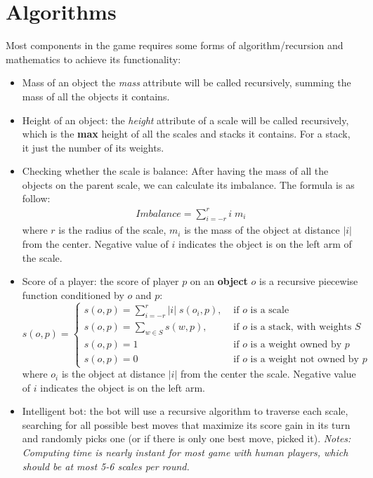\documentclass[12pt]{article}
\begin{document}
\section{Algorithms}
Most components in the game requires some forms of algorithm/recursion and
mathematics to achieve its functionality:
\begin{itemize}
  \item Mass of an object the \textit{mass} attribute will be called recursively,
    summing the mass of all the objects it contains.
  \item Height of an object: the \textit{height} attribute of a scale will be
    called recursively, which is the \textbf{max} height of all the scales and
    stacks it contains. For a stack, it just the number of its weights.
  \item Checking whether the scale is balance: After having the mass of all the
    objects on the parent scale, we can calculate its imbalance. The formula is
    as follow:
    \begin{align*}
      Imbalance = \sum_{i=-r}^{r}i\;m_i
    \end{align*}
    where $r$ is the radius of the scale, $m_i$ is the mass of the object at
    distance $|i|$ from the center. Negative value of $i$ indicates the object
    is on the left arm of the scale.
  \item Score of a player: the score of player $p$ on an \textbf{object} $o$
    is a recursive piecewise function conditioned by $o$ and $p$:
    \begin{equation*}
      s(o,p) = \begin{cases}
        s(o, p) = \sum_{i=-r}^{r} |i|\;s(o_i, p) , &\text{ if $o$ is a scale}\\
        s(o, p) = \sum_{w\in S} s(w, p) , &\text{ if $o$ is a stack, with
        weights $S$}\\
        s(o, p) = 1 &\text{ if $o$ is a weight owned by $p$}\\
        s(o, p) = 0 &\text{ if $o$ is a weight not owned by $p$}
      \end{cases}
    \end{equation*}
    where $o_i$ is the object at distance $|i|$ from the center the scale.
    Negative value of $i$ indicates the object is on the left arm.
  \item Intelligent bot: the bot will use a recursive algorithm to traverse each
    scale, searching for all possible best moves that maximize its score gain in
    its turn and randomly picks one (or if there is only one best move, picked
    it).  \textit{Notes: Computing time is nearly instant for most game with
    human players, which should be at most 5-6 scales per round.} 
\end{itemize}
\end{document}
